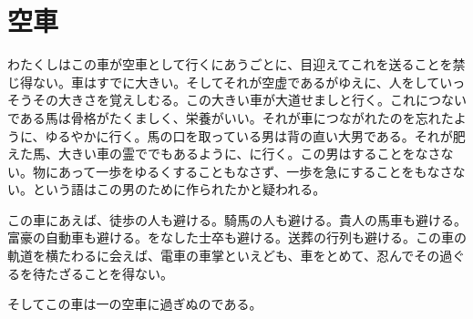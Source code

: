 \section{空車}
わたくしはこの車が空車として行くにあうごとに、目迎えてこれを送ることを禁じ得ない。車はすでに大きい。そしてそれが空虚であるがゆえに、人をしていっそうその大きさを覚えしむる。この大きい車が大道せましと行く。これにつないである馬は骨格がたくましく、栄養がいい。それが車につながれたのを忘れたように、ゆるやかに行く。馬の口を取っている男は背の直い大男である。それが肥えた馬、大きい車の霊ででもあるように、に行く。この男はすることをなさない。物にあって一歩をゆるくすることもなさず、一歩を急にすることをもなさない。という語はこの男のために作られたかと疑われる。

この車にあえば、徒歩の人も避ける。騎馬の人も避ける。貴人の馬車も避ける。富豪の自動車も避ける。をなした士卒も避ける。送葬の行列も避ける。この車の軌道を横たわるに会えば、電車の車掌といえども、車をとめて、忍んでその過ぐるを待たざることを得ない。

そしてこの車は一の空車に過ぎぬのである。